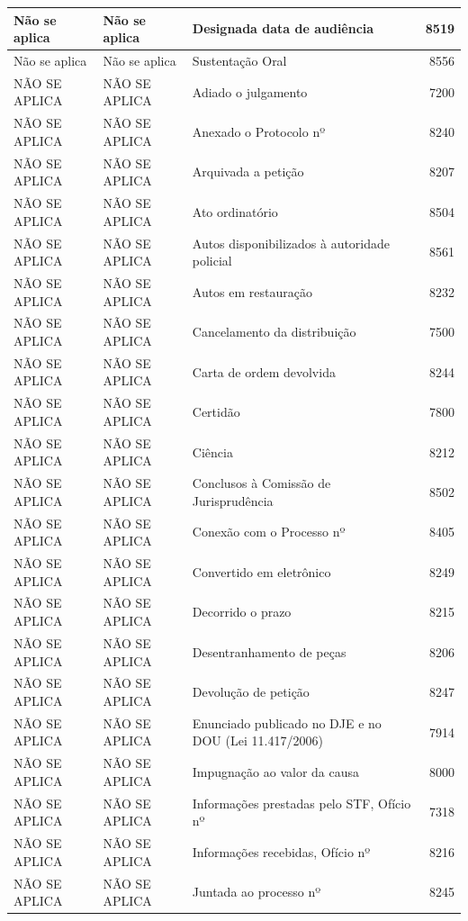 \documentclass[
]{book}
\begin{document}
\begin{tabular}{l|l|l|r}
\hline
Não se aplica & Não se aplica & Designada data de audiência & 8519\\
\hline
Não se aplica & Não se aplica & Sustentação Oral & 8556\\
\hline
NÃO SE APLICA & NÃO SE APLICA & Adiado o julgamento & 7200\\
\hline
NÃO SE APLICA & NÃO SE APLICA & Anexado o Protocolo nº & 8240\\
\hline
NÃO SE APLICA & NÃO SE APLICA & Arquivada a petição & 8207\\
\hline
NÃO SE APLICA & NÃO SE APLICA & Ato ordinatório & 8504\\
\hline
NÃO SE APLICA & NÃO SE APLICA & Autos disponibilizados à autoridade policial & 8561\\
\hline
NÃO SE APLICA & NÃO SE APLICA & Autos em restauração & 8232\\
\hline
NÃO SE APLICA & NÃO SE APLICA & Cancelamento da distribuição & 7500\\
\hline
NÃO SE APLICA & NÃO SE APLICA & Carta de ordem devolvida & 8244\\
\hline
NÃO SE APLICA & NÃO SE APLICA & Certidão & 7800\\
\hline
NÃO SE APLICA & NÃO SE APLICA & Ciência & 8212\\
\hline
NÃO SE APLICA & NÃO SE APLICA & Conclusos à Comissão de Jurisprudência & 8502\\
\hline
NÃO SE APLICA & NÃO SE APLICA & Conexão com o Processo nº & 8405\\
\hline
NÃO SE APLICA & NÃO SE APLICA & Convertido em eletrônico & 8249\\
\hline
NÃO SE APLICA & NÃO SE APLICA & Decorrido o prazo & 8215\\
\hline
NÃO SE APLICA & NÃO SE APLICA & Desentranhamento de peças & 8206\\
\hline
NÃO SE APLICA & NÃO SE APLICA & Devolução de petição & 8247\\
\hline
NÃO SE APLICA & NÃO SE APLICA & Enunciado publicado no DJE e no DOU (Lei 11.417/2006) & 7914\\
\hline
NÃO SE APLICA & NÃO SE APLICA & Impugnação ao valor da causa & 8000\\
\hline
NÃO SE APLICA & NÃO SE APLICA & Informações prestadas pelo STF, Ofício nº & 7318\\
\hline
NÃO SE APLICA & NÃO SE APLICA & Informações recebidas, Ofício nº & 8216\\
\hline
NÃO SE APLICA & NÃO SE APLICA & Juntada ao processo nº & 8245\\

\end{tabular}
\end{document}
